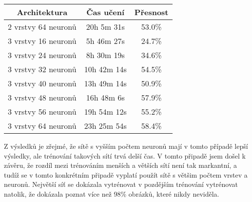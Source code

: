 \begin{center}
    \begin{tabular}{||c c c||}
        \hline
        Architektura        & Čas učení   & Přesnost \\ [0.5ex]
        \hline\hline
        2 vrstvy 64 neuronů & 20h 5m 31s  & 53.0\%   \\
        \hline
        3 vrstvy 16 neuronů & 5h 46m 27s  & 24.7\%   \\
        \hline
        3 vrstvy 24 neuronů & 8h 30m 19s  & 34.6\%   \\
        \hline
        3 vrstvy 32 neuronů & 10h 42m 14s & 54.5\%   \\
        \hline
        3 vrstvy 40 neuronů & 13h 49m 14s & 50.9\%   \\
        \hline
        3 vrstvy 48 neuronů & 16h 48m 6s  & 57.9\%   \\
        \hline
        3 vrstvy 56 neuronů & 19h 54m 12s & 55.2\%   \\
        \hline
        3 vrstvy 64 neuronů & 23h 25m 54s & 58.4\%   \\
        \hline
    \end{tabular}
\end{center}

Z výsledků je zřejmé, že sítě s vyšším počtem neuronů mají v tomto případě lepší výsledky, ale trénování takových sítí trvá delší čas.
V tomto připadě jsem došel k závěru, že rozdíl mezi trénováním menších a větších sítí není tak markantní,
a tudíž se v tomto konkrétním připadě vyplatí použít sítě s většim počtem vrstev a neuronů.
Největší síť se dokázala vytrénovat v pozdějším trénování vytrénovat natolik, že dokázala poznat více než 98\% obrázků, které nikdy neviděla.